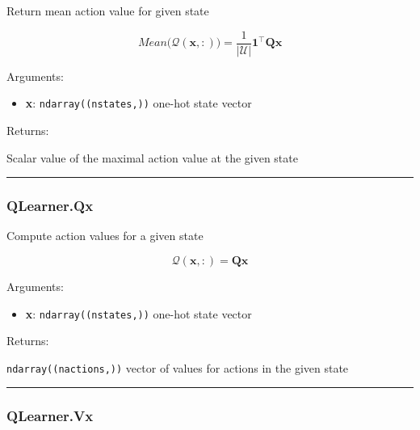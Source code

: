 Return mean action value for given state

\[
Mean \big(\mathcal Q(\mathbf x, :)\big) = \frac{1}{|\mathcal U|} \mathbf 1^\top \mathbf Q \mathbf x
\]

Arguments:

\begin{itemize}
\tightlist
\item
  \textbf{x}: \texttt{ndarray((nstates,))} one-hot state vector
\end{itemize}

Returns:

Scalar value of the maximal action value at the given state

\begin{center}\rule{0.5\linewidth}{\linethickness}\end{center}

\hypertarget{qlearner.qx}{%
\subsubsection{QLearner.Qx}\label{qlearner.qx}}

\begin{Shaded}
\begin{Highlighting}[]
\end{Highlighting}
\end{Shaded}

Compute action values for a given state

\[
\mathcal Q(\mathbf x, :) = \mathbf Q \mathbf x
\]

Arguments:

\begin{itemize}
\tightlist
\item
  \textbf{x}: \texttt{ndarray((nstates,))} one-hot state vector
\end{itemize}

Returns:

\texttt{ndarray((nactions,))} vector of values for actions in the given
state

\begin{center}\rule{0.5\linewidth}{\linethickness}\end{center}

\hypertarget{qlearner.vx}{%
\subsubsection{QLearner.Vx}\label{qlearner.vx}}

